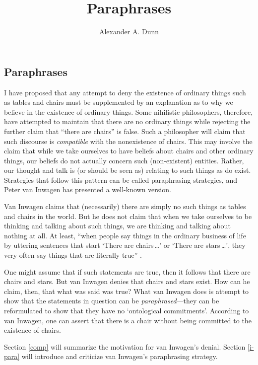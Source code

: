 \documentclass[11pt]{article}
\title{Paraphrases}
\author{Alexander A. Dunn}
\begin{document}
\ifstandalone
\maketitle
\begin{spacing}{1.5}
\fi

\section{Paraphrases}
\label{van-paraphrase}
I have proposed that any attempt to deny the existence of ordinary
things such as tables and chairs must be supplemented by an
explanation as to why we believe in the existence of ordinary things.
Some nihilistic philosophers, therefore, have attempted to maintain
that there are no ordinary things while rejecting the further claim
that ``there are chairs'' is false.  Such a philosopher will claim
that such discourse is {\em compatible} with the nonexistence of
chairs.  This may involve the claim that while we take ourselves to
have beliefs about chairs and other ordinary things, our beliefs do
not actually concern such (non-existent) entities.  Rather, our
thought and talk is (or should be seen as) relating to such things as
do exist.  Strategies that follow this pattern can be called
paraphrasing strategies, and Peter van Inwagen has presented a
well-known version.

Van Inwagen claims that (necessarily) there are simply no such things
as tables and chairs in the world.  But he does not claim that when we
take ourselves to be thinking and talking about such things, we are
thinking and talking about nothing at all.  At least, ``when people
say things in the ordinary business of life by uttering sentences that
start `There are chairs\,\ldots ' or `There are stars\,\ldots ', they
very often say things that are literally true''
\citep[102]{inwagen1995}.

One might assume that if such statements are true, then it follows
that there are chairs and stars.  But van Inwagen denies that chairs
and stars exist.  How can he claim, then, that what was said was true?
What van Inwagen does is attempt to show that the statements in
question can be {\em paraphrased}---they can be reformulated to show
that they have no `ontological commitments'.  According to van
Inwagen, one can assert that there is a chair without being committed
to the existence of chairs.

Section \ref{comp} will summarize the motivation for van Inwagen's
denial.  Section \ref{i-para} will introduce and criticize van
Inwagen's paraphrasing strategy.


\end{spacing}
\end{document}
